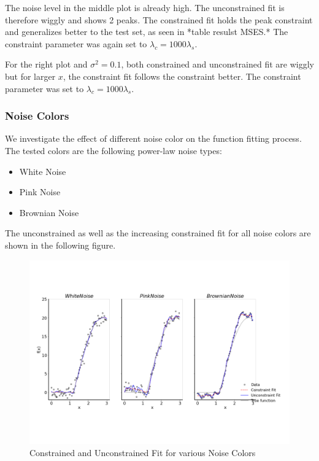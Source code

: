 \documentclass[10pt,a4paper]{article}
\begin{document}
The noise level in the middle plot is already high. The unconstrained fit is therefore wiggly and shows 2 peaks. The constrained fit holds the peak constraint and generalizes better to the test set, as seen in *table resulst MSES.* The constraint parameter was again set to $\lambda_c = 1000\lambda_s.$ 

For the right plot and $\sigma^2=0.1$, both constrained and unconstrained fit are wiggly but for larger $x$, the constraint fit follows the constraint better. The constraint parameter was set to $\lambda_c = 1000\lambda_s$.

\subsubsection{Noise Colors}

We investigate the effect of different noise color on the function fitting process. The tested colors are the following power-law noise types:

\begin{itemize}
	\item  White Noise
	\item Pink Noise
	\item Brownian Noise
\end{itemize}

The unconstrained as well as the increasing constrained fit for all noise colors are shown in the following figure.

\begin{figure}[H]
	\centering
	\includegraphics[width=\columnwidth]{../thesisplots/exp_noise_colors.pdf}
	\caption{Constrained and Unconstrained Fit for various Noise Colors}
	\label{fig:fit_noise_colors}
\end{figure}
\end{document}
